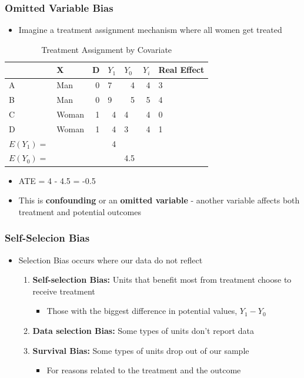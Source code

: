 \documentclass[xcolor=x11names,compress]{beamer}\usepackage[]{graphicx}\usepackage[]{color}
\renewcommand{\(}{\begin{columns}}
\renewcommand{\)}{\end{columns}}
\newcommand{\<}[1]{\begin{column}{#1}}
\renewcommand{\>}{\end{column}}
\begin{document}
\begin{frame}
\frametitle{Omitted Variable Bias}
\begin{itemize}
\item Imagine a treatment assignment mechanism where all women get treated
\end{itemize}
\begin{table}[htbp]
  \centering
  \caption{Treatment Assignment by Covariate}
    \begin{tabular}{|l|l|r|r|l|r|l|}
    \hline
          & X     & \multicolumn{1}{l|}{D} & \multicolumn{1}{l|}{$Y_1$} & $Y_0$  & \multicolumn{1}{l|}{$Y_i$} & Real Effect \bigstrut\\
    \hline
    A     & Man   & 0     & \multicolumn{1}{l|}{7} & \multicolumn{1}{r|}{\cellcolor{teal}4} & 4     & 3 \bigstrut\\
    \hline
    B     & Man   & 0     & \multicolumn{1}{l|}{9} & \multicolumn{1}{r|}{\cellcolor{teal}5} & 5     & 4 \bigstrut\\
    \hline
    C     & Woman & 1     & \cellcolor{teal}4     & 4     & 4     & 0 \bigstrut\\
    \hline
    D     & Woman & 1     & \cellcolor{teal}4     & 3     & 4     & 1 \bigstrut\\
    \hline\pause
    $E(Y_1)=$ & & & 4 & & \bigstrut\\
    \hline
    $E(Y_0)=$ & &  & & 4.5 & \bigstrut\\
    \hline
    \end{tabular}%
  \label{tab:addlabel}%
\end{table}%
\begin{itemize}
\pause
\item ATE = 4 - 4.5 = -0.5
\item This is \textbf{confounding} or an \textbf{omitted variable} - another variable affects both treatment and potential outcomes
\end{itemize}
\end{frame}

\begin{frame}
\frametitle{Self-Selecion Bias}
\begin{itemize}
\item Selection Bias occurs where our data do not reflect 
\pause
\begin{enumerate}
\item \textbf{Self-selection Bias:} Units that benefit most from treatment choose to receive treatment
\begin{itemize}
\item Those with the biggest difference  in potential values, $Y_1 - Y_0$
\end{itemize}
\item \textbf{Data selection Bias:} Some types of units don't report data
\item \textbf{Survival Bias:} Some types of units drop out of our sample
\begin{itemize}
\item For reasons related to the treatment and the outcome
\end{itemize}
\end{enumerate}
\end{itemize}
\end{frame}
\end{document}
